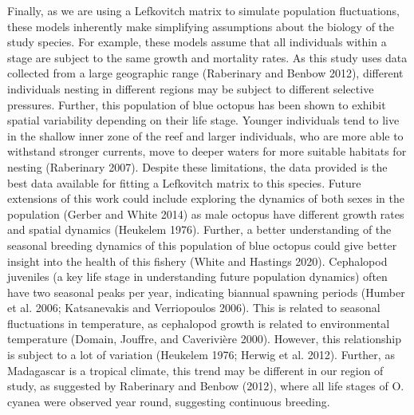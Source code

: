 \documentclass[
]{article}
\begin{document}
Finally, as we are using a Lefkovitch matrix to simulate population fluctuations, these models inherently make simplifying assumptions about the biology of the study species. For example, these models assume that all individuals within a stage are subject to the same growth and mortality rates. As this study uses data collected from a large geographic range (Raberinary and Benbow 2012), different individuals nesting in different regions may be subject to different selective pressures. Further, this population of blue octopus has been shown to exhibit spatial variability depending on their life stage. Younger individuals tend to live in the shallow inner zone of the reef and larger individuals, who are more able to withstand stronger currents, move to deeper waters for more suitable habitats for nesting (Raberinary 2007). Despite these limitations, the data provided is the best data available for fitting a Lefkovitch matrix to this species. Future extensions of this work could include exploring the dynamics of both sexes in the population (Gerber and White 2014) as male octopus have different growth rates and spatial dynamics (Heukelem 1976). Further, a better understanding of the seasonal breeding dynamics of this population of blue octopus could give better insight into the health of this fishery (White and Hastings 2020). Cephalopod juveniles (a key life stage in understanding future population dynamics) often have two seasonal peaks per year, indicating biannual spawning periods (Humber et al. 2006; Katsanevakis and Verriopoulos 2006). This is related to seasonal fluctuations in temperature, as cephalopod growth is related to environmental temperature (Domain, Jouffre, and Caverivière 2000). However, this relationship is subject to a lot of variation (Heukelem 1976; Herwig et al. 2012). Further, as Madagascar is a tropical climate, this trend may be different in our region of study, as suggested by Raberinary and Benbow (2012), where all life stages of O. cyanea were observed year round, suggesting continuous breeding.
\end{document}
